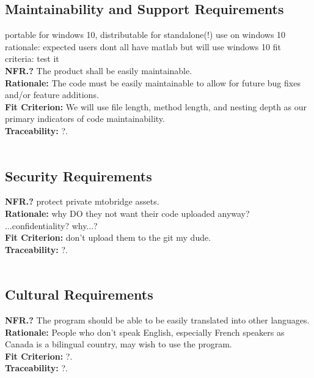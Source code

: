 \documentclass[12pt]{article}
\begin{document}
\subsection{Maintainability and Support Requirements}

portable for windows 10, distributable for standalone(!) use on windows 10
rationale: expected users dont all have matlab but will use windows 10
fit criteria: test it\\

  \textbf{NFR.?} The product shall be easily maintainable.\\
  \textbf{Rationale:} The code must be easily maintainable to allow for future bug fixes and/or feature additions.\\
  \textbf{Fit Criterion:} We will use file length, method length, and nesting depth as our primary indicators of code maintainability.\\
  \textbf{Traceability:} ?.\\\\

\subsection{Security Requirements}

  \textbf{NFR.?} protect private mtobridge assets.\\
  \textbf{Rationale:} why DO they not want their code uploaded anyway? ...confidentiality? why...?\\
  \textbf{Fit Criterion:} don't upload them to the git my dude.\\
  \textbf{Traceability:} ?.\\\\

\subsection{Cultural Requirements}

  \textbf{NFR.?} The program should be able to be easily translated into other languages.\\
  \textbf{Rationale:} People who don't speak English, especially French speakers as Canada is a bilingual country, may wish to use the program.\\
  \textbf{Fit Criterion:} ?.\\
  \textbf{Traceability:} ?.\\\\
\end{document}
